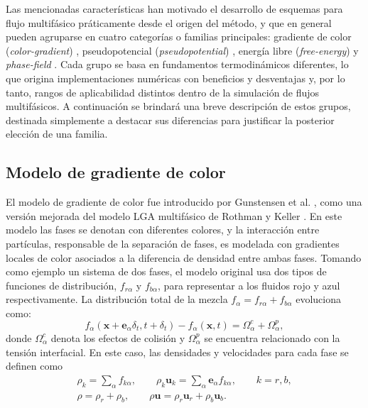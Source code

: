 Las mencionadas caracter\'isticas han motivado el desarrollo de esquemas para flujo multif\'asico pr\'aticamente desde el origen del m\'etodo, y que en general pueden agruparse en cuatro categor\'ias o familias principales: gradiente de color (\emph{color-gradient}) \cite{liu_three-dimensional_2012,gunstensen_lattice_1991}, pseudopotencial (\emph{pseudopotential}) \cite{shan_lattice_1993,shan_simulation_1994,chen_critical_2014}, energ\'ia libre (\emph{free-energy}) \cite{swift_lattice_1996,inamuro_galilean_2000} y \emph{phase-field} \cite{he_lattice_1999,liang_phase-field-based_2014}. Cada grupo se basa en fundamentos termodin\'amicos diferentes, lo que origina implementaciones num\'ericas con beneficios y desventajas y, por lo tanto, rangos de aplicabilidad distintos dentro de la simulaci\'on de flujos multif\'asicos. A continuaci\'on se brindar\'a una breve descripci\'on de estos grupos, destinada simplemente a destacar sus diferencias para justificar la posterior elecci\'on de una familia.
\newpage

\subsection{Modelo de gradiente de color}
El modelo de gradiente de color fue introducido por Gunstensen et al. \cite{gunstensen_lattice_1991}, como una versi\'on mejorada del modelo LGA multif\'asico de Rothman y Keller \cite{rothman_immiscible_1988}. En este modelo las fases se denotan con diferentes colores, y la interacci\'on entre part\'iculas, responsable de la separaci\'on de fases, es modelada con gradientes locales de color asociados a la diferencia de densidad entre ambas fases. Tomando como ejemplo un sistema de dos fases, el modelo original usa dos tipos de funciones de distribuci\'on, $f_{r{\alpha}}$ y $f_{b{\alpha}}$, para representar a los fluidos rojo y azul respectivamente. La distribuci\'on total de la mezcla $f_{\alpha} = f_{r{\alpha}}+f_{b{\alpha}}$ evoluciona como:
\begin{equation}
	f_{\alpha}(\bm{x}+\bm{e}_{\alpha} \delta_t,t+\delta_t) - f_{\alpha}(\bm{x},t) = \Omega_{\alpha}^c + \Omega_{\alpha}^p,
\end{equation}
donde $\Omega_{\alpha}^c$ denota los efectos de colisi\'on y $\Omega_{\alpha}^p$ se encuentra relacionado con la tensi\'on interfacial. En este caso, las densidades y velocidades para cada fase se definen como
\begin{equation}
	\begin{gathered}
	\rho_k = \sum_{\alpha} f_{k{\alpha}}, \qquad \rho_k\bm{u}_k = \sum_{\alpha} \bm{e}_{\alpha} f_{k{\alpha}}, \qquad k=r,b, \\
	\rho = \rho_r + \rho_b, \qquad \rho\bm{u} = \rho_r\bm{u}_r + \rho_b\bm{u}_b.
	\end{gathered}
\end{equation}

